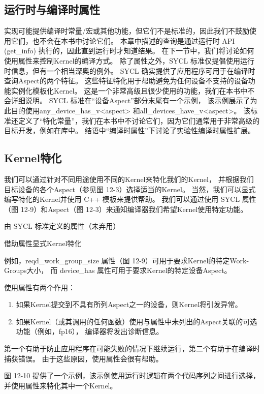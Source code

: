 \subsection{运行时与编译时属性}
实现可能提供编译时常量/宏或其他功能，但它们不是标准的，因此我们不鼓励使用它们，也不会在本书中讨论它们。 
本章中描述的查询是通过运行时 API (get\_info) 执行的，因此直到运行时才知道结果。 
在下一节中，我们将讨论如何使用属性来控制Kernel的编译方式。 
除了属性之外，SYCL 标准仅提倡使用运行时信息，但有一个相当深奥的例外。 
SYCL 确实提供了应用程序可用于在编译时查询Aspect的两个特征。 
这些特征特化用于帮助避免为任何设备不支持的设备功能实例化模板化Kernel。 
这是一个非常高级且很少使用的功能，我们在本书中不会详细说明。 
SYCL 标准在“设备Aspect”部分末尾有一个示例，
该示例展示了为此目的使用any\_device\_has\_v<aspect> 和all\_devices\_have\_v<aspect>。 
该标准还定义了“特化常量”，我们在本书中不讨论它们，因为它们通常用于非常高级的目标开发，例如在库中。 
结语中“编译时属性”下讨论了实验性编译时属性扩展。

\subsection{Kernel特化}
我们可以通过针对不同用途使用不同的Kernel来特化我们的Kernel，
并根据我们目标设备的各个Aspect（参见图 12-3）选择适当的Kernel。 
当然，我们可以显式编写特化的Kernel并使用 C++ 模板来提供帮助。 
我们可以通过使用 SYCL 属性（图 12-9）和Aspect（图 12-3）来通知编译器我们希望Kernel使用特定功能。

{\color{red} 由 SYCL 标准定义的属性（未弃用）}

{\color{red} 借助属性显式Kernel特化}

例如，reqd\_work\_group\_size 属性（图 12-9）可用于要求Kernel的特定Work-Groups大小，
而 device\_has 属性可用于要求Kernel的特定设备Aspect。

使用属性有两个作用：

\begin{enumerate}
	\item 如果Kernel提交到不具有所列Aspect之一的设备，则Kernel将引发异常。

	\item 如果Kernel（或其调用的任何函数）使用与属性中未列出的Aspect关联的可选功能（例如，fp16），
	编译器将发出诊断信息。
\end{enumerate}

第一个有助于防止应用程序在可能失败的情况下继续运行，第二个有助于在编译时捕获错误。 
由于这些原因，使用属性会很有帮助。

图 12-10 提供了一个示例，该示例使用运行时逻辑在两个代码序列之间进行选择，并使用属性来特化其中一个Kernel。

